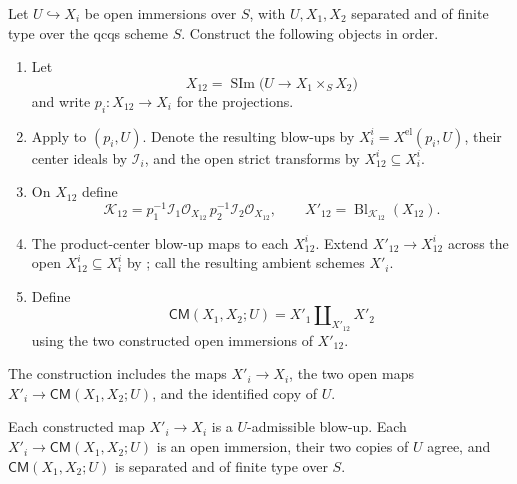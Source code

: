 \begin{definition}
  \label{def:nagata-common-modification}

  Let $U\hookrightarrow X_i$ be open immersions over $S$, with
  $U,X_1,X_2$ separated and of finite type over the qcqs scheme $S$.
  Construct the following objects in order.
  \begin{enumerate}
    \item Let
      \[
        X_{12}=\operatorname{SIm}
        \bigl(U\longrightarrow X_1\times_SX_2\bigr)
      \]
      and write $p_i\colon X_{12}\to X_i$ for the projections.
    \item Apply  to $(p_i,U)$.
      Denote the resulting blow-ups by
      $X_i^i= X^{\mathrm{el}}(p_i,U)$, their center ideals by
      $\mathcal I_i$, and the open strict transforms by
      $X_{12}^i\subseteq X_i^i$.
    \item On $X_{12}$ define
      \[
        \mathcal K_{12}
          =p_1^{-1}\mathcal I_1\mathcal O_{X_{12}}\,
           p_2^{-1}\mathcal I_2\mathcal O_{X_{12}},
        \qquad
        X'_{12}=\operatorname{Bl}_{\mathcal K_{12}}(X_{12}).
      \]
    \item The product-center blow-up maps to each $X_{12}^i$.  Extend
      $X'_{12}\to X_{12}^i$ across the open
      $X_{12}^i\subseteq X_i^i$ by
      ; call the resulting
      ambient schemes $X'_i$.
    \item Define
      \[
        \mathsf{CM}(X_1,X_2;U)=X'_1\amalg_{X'_{12}}X'_2
      \]
      using the two constructed open immersions of $X'_{12}$.
  \end{enumerate}
  The construction includes the maps $X'_i\to X_i$, the two open maps
  $X'_i\to\mathsf{CM}(X_1,X_2;U)$, and the identified copy of $U$.
\end{definition}

\begin{lemma}
  \label{lemma:nagata-common-modification}

  Each constructed map $X'_i\to X_i$ is a $U$-admissible blow-up.  Each
  $X'_i\to\mathsf{CM}(X_1,X_2;U)$ is an open immersion, their two copies of
  $U$ agree, and $\mathsf{CM}(X_1,X_2;U)$ is separated and of finite type
  over $S$.
\end{lemma}

